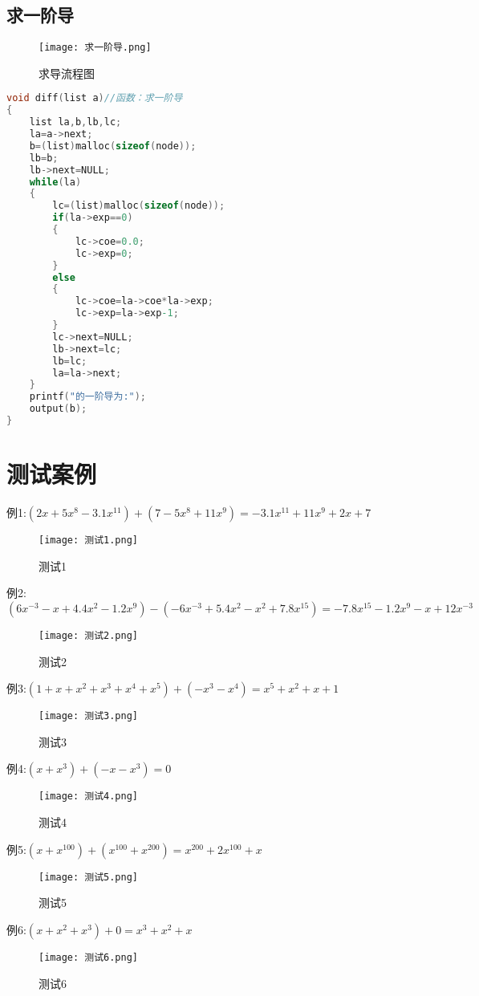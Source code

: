 \documentclass{DateStructure}
\begin{document}
\subsection{求一阶导}
\begin{figure}[H]
\centering
\texttt{[image: 求一阶导.png]}
\caption{求导流程图}
\end{figure}
\begin{lstlisting}[language=C,caption={diff}]
void diff(list a)//函数：求一阶导
{
	list la,b,lb,lc;
	la=a->next;
	b=(list)malloc(sizeof(node));
	lb=b;
	lb->next=NULL;
	while(la)
	{
		lc=(list)malloc(sizeof(node));
		if(la->exp==0)
		{	
			lc->coe=0.0;
			lc->exp=0;
		}
		else
		{
			lc->coe=la->coe*la->exp;
			lc->exp=la->exp-1;
		}
		lc->next=NULL;
		lb->next=lc;
		lb=lc;
		la=la->next;
	}
	printf("的一阶导为:");
	output(b);
}
\end{lstlisting}		

\section{测试案例}
例1:$(2x+5x^{8}-3.1x^{11})+(7-5x^{8}+11x^{9})=-3.1x^{11}+11x^{9}+2x+7$\par
\begin{figure}[H]
\centering
\texttt{[image: 测试1.png]}
\caption{测试1}
\end{figure}	
例2:$(6x^{-3}-x+4.4x^{2}-1.2x^{9})-(-6x^{-3}+5.4x^{2}-x^{2}+7.8x^{15})=-7.8x^{15}-1.2x^{9}-x+12x^{-3}$\par
\begin{figure}[H]
\centering
\texttt{[image: 测试2.png]}
\caption{测试2}
\end{figure}
例3:$(1+x+x^{2}+x^{3}+x^{4}+x^{5})+(-x^{3}-x^{4})=x^{5}+x^{2}+x+1$\par
\begin{figure}[H]
\centering
\texttt{[image: 测试3.png]}
\caption{测试3}
\end{figure}
例4:$(x+x^{3})+(-x-x^{3})=0$\par
\begin{figure}[H]
\centering
\texttt{[image: 测试4.png]}
\caption{测试4}
\end{figure}
例5:$(x+x^{100})+(x^{100}+x^{200})=x^{200}+2x^{100}+x$\par
\begin{figure}[H]
\centering
\texttt{[image: 测试5.png]}
\caption{测试5}
\end{figure}
例6:$(x+x^{2}+x^{3})+0=x^{3}+x^{2}+x$\par
\begin{figure}[H]
\centering
\texttt{[image: 测试6.png]}
\caption{测试6}
\end{figure}
\end{document}

